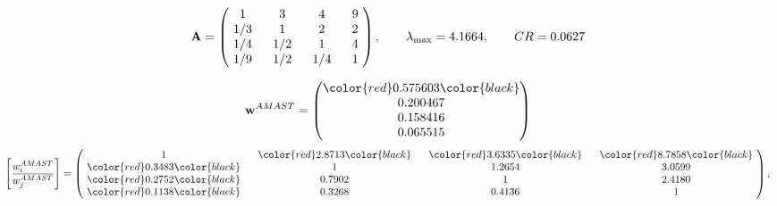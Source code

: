 \begin{example}
\begin{equation*}
\mathbf{A} =
\begin{pmatrix}
$\,\,$ 1 $\,\,$ & $\,\,$3$\,\,$ & $\,\,$4$\,\,$ & $\,\,$9 $\,\,$ \\
$\,\,$ 1/3$\,\,$ & $\,\,$ 1 $\,\,$ & $\,\,$2$\,\,$ & $\,\,$2 $\,\,$ \\
$\,\,$ 1/4$\,\,$ & $\,\,$ 1/2$\,\,$ & $\,\,$ 1 $\,\,$ & $\,\,$4 $\,\,$ \\
$\,\,$ 1/9$\,\,$ & $\,\,$ 1/2$\,\,$ & $\,\,$ 1/4$\,\,$ & $\,\,$ 1  $\,\,$ \\
\end{pmatrix},
\qquad
\lambda_{\max} =
4.1664,
\qquad
CR = 0.0627
\end{equation*}

\begin{equation*}
\mathbf{w}^{AMAST} =
\begin{pmatrix}
\color{red} 0.575603\color{black} \\
0.200467\\
0.158416\\
0.065515
\end{pmatrix}\end{equation*}
\begin{equation*}
\left[ \frac{{w}^{AMAST}_i}{{w}^{AMAST}_j} \right] =
\begin{pmatrix}
$\,\,$ 1 $\,\,$ & $\,\,$\color{red} 2.8713\color{black} $\,\,$ & $\,\,$\color{red} 3.6335\color{black} $\,\,$ & $\,\,$\color{red} 8.7858\color{black} $\,\,$ \\
$\,\,$\color{red} 0.3483\color{black} $\,\,$ & $\,\,$ 1 $\,\,$ & $\,\,$1.2654$\,\,$ & $\,\,$3.0599  $\,\,$ \\
$\,\,$\color{red} 0.2752\color{black} $\,\,$ & $\,\,$0.7902$\,\,$ & $\,\,$ 1 $\,\,$ & $\,\,$2.4180 $\,\,$ \\
$\,\,$\color{red} 0.1138\color{black} $\,\,$ & $\,\,$0.3268$\,\,$ & $\,\,$0.4136$\,\,$ & $\,\,$ 1  $\,\,$ \\
\end{pmatrix},
\end{equation*}


\end{example}
